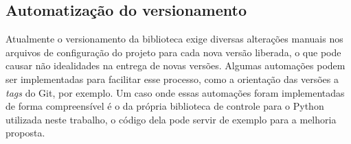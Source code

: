 \subsection{Automatização do versionamento}
Atualmente o versionamento da biblioteca exige diversas alterações manuais nos arquivos de configuração do projeto para
cada nova versão liberada, o que pode causar não idealidades na entrega de novas versões.
Algumas automações podem ser implementadas para facilitar esse processo, como a orientação das versões a \textit{tags} do Git,
por exemplo.
Um caso onde essas automações foram implementadas de forma compreensível é o da própria biblioteca de controle para o
Python utilizada neste trabalho, o código dela pode servir de exemplo para a melhoria proposta.
